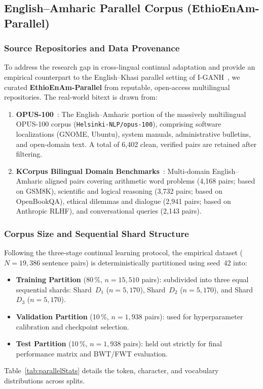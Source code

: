 \documentclass[11pt,a4paper]{article}
\begin{document}
\subsection{English--Amharic Parallel Corpus (EthioEnAm-Parallel)}
\label{sec:parallel_dataset}

\subsubsection{Source Repositories and Data Provenance}
To address the research gap in cross-lingual continual adaptation and
provide an empirical counterpart to the English--Khasi parallel setting of
I-GANH~\cite{Syiemlieh2026}, we curated \textbf{EthioEnAm-Parallel} from
reputable, open-access multilingual repositories.  The real-world bitext
is drawn from:
\begin{enumerate}
  \item \textbf{OPUS-100}~\cite{Tiedemann2012,Zhang2020OPUS100}: The
        English--Amharic portion of the massively multilingual OPUS-100
        corpus (\texttt{Helsinki-NLP/opus-100}), comprising software
        localizations (GNOME, Ubuntu), system manuals, administrative
        bulletins, and open-domain text.  A total of 6,402 clean, verified
        pairs are retained after filtering.
  \item \textbf{KCorpus Bilingual Domain Benchmarks}~\cite{Alebachew2025}:
        Multi-domain English--Amharic aligned pairs covering arithmetic
        word problems (4,168 pairs; based on GSM8K), scientific and logical
        reasoning (3,732 pairs; based on OpenBookQA), ethical dilemmas and
        dialogue (2,941 pairs; based on Anthropic RLHF), and conversational
        queries (2,143 pairs).
\end{enumerate}

\subsubsection{Corpus Size and Sequential Shard Structure}
Following the three-stage continual learning protocol, the empirical
dataset ($N = 19,386$ sentence pairs) is deterministically partitioned
using seed~42 into:
\begin{itemize}
  \item \textbf{Training Partition} (80\,\%, $n = 15,510$ pairs):
        subdivided into three equal sequential shards:
        Shard~$D_1$ ($n=5,170$), Shard~$D_2$ ($n=5,170$), and
        Shard~$D_3$ ($n=5,170$).
  \item \textbf{Validation Partition} (10\,\%, $n = 1,938$ pairs):
        used for hyperparameter calibration and checkpoint selection.
  \item \textbf{Test Partition} (10\,\%, $n = 1,938$ pairs): held out
        strictly for final performance matrix and BWT/FWT evaluation.
\end{itemize}
Table~\ref{tab:parallelStats} details the token, character, and vocabulary
distributions across splits.
\end{document}
